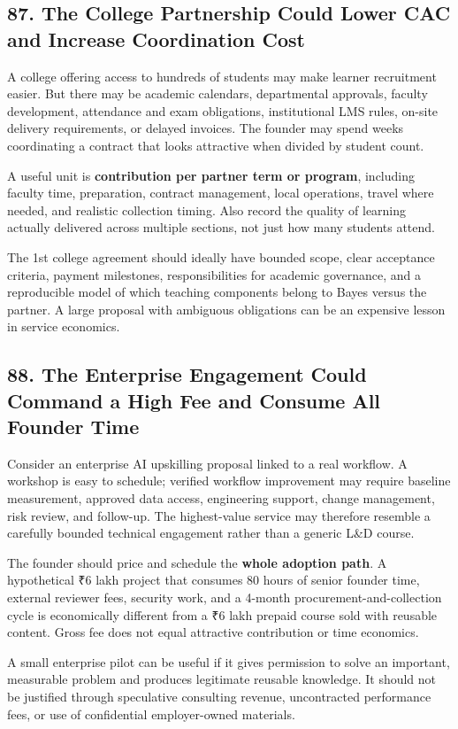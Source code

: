 \subsection*{87. The College Partnership Could Lower CAC and Increase Coordination Cost}

A college offering access to hundreds of students may make learner recruitment easier. But there may be academic calendars, departmental approvals, faculty development, attendance and exam obligations, institutional LMS rules, on-site delivery requirements, or delayed invoices. The founder may spend weeks coordinating a contract that looks attractive when divided by student count.

A useful unit is \textbf{contribution per partner term or program}, including faculty time, preparation, contract management, local operations, travel where needed, and realistic collection timing. Also record the quality of learning actually delivered across multiple sections, not just how many students attend.

The 1st college agreement should ideally have bounded scope, clear acceptance criteria, payment milestones, responsibilities for academic governance, and a reproducible model of which teaching components belong to Bayes versus the partner. A large proposal with ambiguous obligations can be an expensive lesson in service economics.

\subsection*{88. The Enterprise Engagement Could Command a High Fee and Consume All Founder Time}

Consider an enterprise AI upskilling proposal linked to a real workflow. A workshop is easy to schedule; verified workflow improvement may require baseline measurement, approved data access, engineering support, change management, risk review, and follow-up. The highest-value service may therefore resemble a carefully bounded technical engagement rather than a generic L\&D course.

The founder should price and schedule the \textbf{whole adoption path}. A hypothetical ₹6 lakh project that consumes 80 hours of senior founder time, external reviewer fees, security work, and a 4-month procurement-and-collection cycle is economically different from a ₹6 lakh prepaid course sold with reusable content. Gross fee does not equal attractive contribution or time economics.

A small enterprise pilot can be useful if it gives permission to solve an important, measurable problem and produces legitimate reusable knowledge. It should not be justified through speculative consulting revenue, uncontracted performance fees, or use of confidential employer-owned materials.

